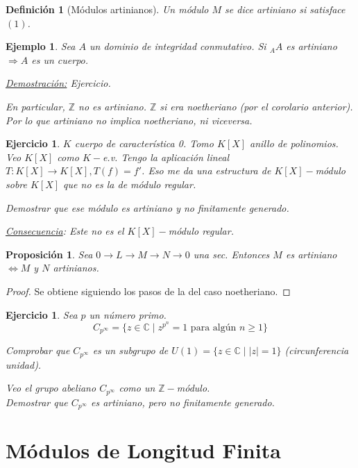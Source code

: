 \documentclass[11pt,a4paper]{article}
\theoremstyle{break}
\newtheorem{example}[theorem]{Ejemplo}
\newtheorem{definition}[theorem]{Definición}
\newtheorem{proposition}[theorem]{Proposición}
\newtheorem{task}[theorem]{Ejercicio}
\begin{document}
\begin{definition}[Módulos artinianos]
Un módulo $M$ se dice artiniano si satisface $(1)$.
\end{definition}

\begin{example}
Sea $A$ un dominio de integridad conmutativo. Si $_{A}A$ es artiniano $\Rightarrow A$ es un cuerpo.

\underline{Demostración:} Ejercicio.

En particular, $\mathbb{Z}$ no es artiniano. $\mathbb{Z}$ si era noetheriano (por el corolario anterior). Por lo que artiniano no implica noetheriano, ni viceversa.
\end{example}

\begin{task}
$K$ cuerpo de característica 0. Tomo $K[X]$ anillo de polinomios. Veo $K[X]$ como $K-$e.v. Tengo la aplicación lineal $T: K[X] \to K[X], T(f) = f'$. Eso me da una estructura de $K[X]-$módulo sobre $K[X]$ que no es la de módulo regular.

Demostrar que ese módulo es artiniano y no finitamente generado.

\underline{Consecuencia}: Este no es el $K[X]-$módulo regular.
\end{task}

\begin{proposition}
Sea $0 \to L \to M \to N \to 0$ una sec. Entonces $M$ es artiniano $\iff M$ y $N$ artinianos.
\end{proposition}

\begin{proof}
Se obtiene siguiendo los pasos de la del caso noetheriano.
\end{proof}

\begin{task}
Sea $p$ un número primo.
$$C_{p^{\infty}} = \{z \in \mathbb{C} \mid z^{p^{n}} = 1 \text{ para algún } n \geq 1\}$$

Comprobar que $C_{p^{\infty}}$ es un subgrupo de $U(1) = \{z \in \mathbb{C} \mid |z| = 1\}$ (circunferencia unidad).

Veo el grupo abeliano $C_{p^{\infty}}$ como un $\mathbb{Z}-$módulo. \\
Demostrar que $C_{p^{\infty}}$ es artiniano, pero no finitamente generado.
\end{task}

\newpage

\section{Módulos de Longitud Finita}
\end{document}

